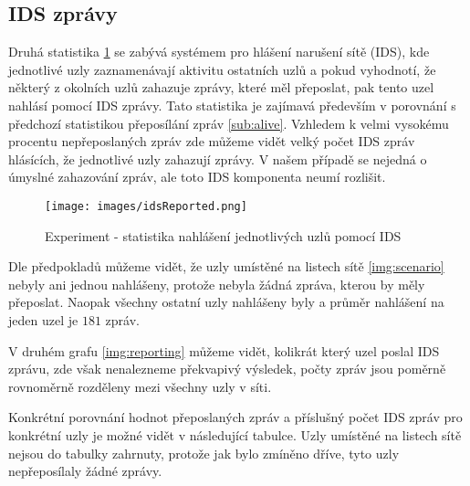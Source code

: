 \documentclass[11pt,final,twoside]{fithesis2}
\begin{document}
\subsection{IDS zprávy}

Druhá statistika \ref{img:reported} se zabývá systémem pro hlášení narušení sítě (IDS), kde jednotlivé uzly zaznamenávají aktivitu ostatních uzlů a pokud vyhodnotí, že některý z okolních uzlů zahazuje 
zprávy, které měl přeposlat, pak tento uzel nahlásí pomocí IDS zprávy. Tato statistika je zajímavá především v porovnání s předchozí statistikou přeposílání zpráv \ref{sub:alive}. Vzhledem k velmi vysokému 
procentu nepřeposlaných zpráv zde můžeme vidět velký počet IDS zpráv hlásících, že jednotlivé uzly zahazují zprávy. V našem případě se nejedná o úmyslné zahazování zpráv, ale toto IDS komponenta neumí 
rozlišit.

\begin{figure}[h]
     \centering
     \texttt{[image: images/idsReported.png]}
     \caption{Experiment - statistika nahlášení jednotlivých uzlů pomocí IDS}
     \label{img:reported}
\end{figure}

Dle předpokladů můžeme vidět, že uzly umístěné na listech sítě \ref{img:scenario} nebyly ani jednou nahlášeny, protože nebyla žádná zpráva, kterou by měly přeposlat. Naopak všechny ostatní uzly nahlášeny 
byly a průměr nahlášení na jeden uzel je $181$ zpráv. 

V druhém grafu \ref{img:reporting} můžeme vidět, kolikrát který uzel poslal IDS zprávu, zde však nenalezneme překvapivý výsledek, počty zpráv jsou poměrně rovnoměrně rozděleny mezi všechny uzly v síti. 

Konkrétní porovnání hodnot přeposlaných zpráv a příslušný počet IDS zpráv pro konkrétní uzly je možné vidět v následující tabulce. Uzly umístěné na listech sítě nejsou do tabulky zahrnuty, protože jak 
bylo zmíněno dříve, tyto uzly nepřeposílaly žádné zprávy. 
\end{document}
